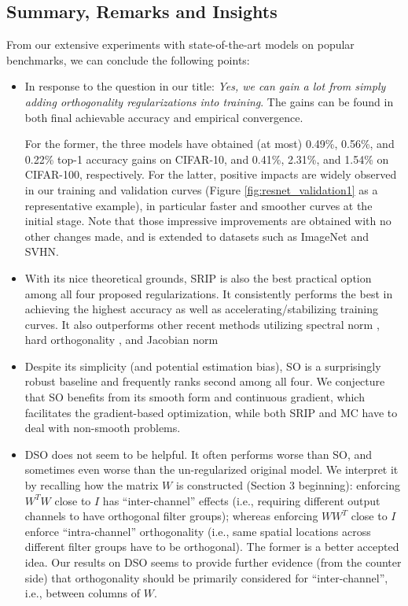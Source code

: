 \documentclass{article}
\begin{document}
\subsection{Summary, Remarks and Insights}
From our extensive experiments with state-of-the-art models on popular benchmarks, we can conclude the following points:
\begin{itemize}
\vspace{-0.6em}
    \item In response to the question in our title: \textit{Yes, we can gain a lot from simply adding orthogonality regularizations into training}. The gains can be found in both final achievable accuracy and empirical convergence.

    For the former, the three models have obtained (at most) 0.49\%, 0.56\%, and 0.22\% top-1 accuracy gains on CIFAR-10, and 0.41\%, 2.31\%, and 1.54\% on CIFAR-100, respectively. For the latter, positive impacts are widely observed in our training and validation curves (Figure \ref{fig:resnet_validation1} as a representative example), in particular faster and smoother curves at the initial stage.
    Note that those impressive improvements are obtained with no other changes made, and is extended to datasets such as  ImageNet and SVHN.

    \item With its nice theoretical grounds, SRIP is also the best practical option among all four proposed regularizations. It consistently performs the best in achieving the highest accuracy as well as accelerating/stabilizing training curves. It also outperforms other recent methods utilizing spectral norm \cite{yoshida2017spectral}, hard orthogonality \cite{huang2017orthogonal}, and Jacobian norm \cite{sokolic2017robust}

    \item Despite its simplicity (and potential estimation bias), SO is a surprisingly robust baseline and frequently ranks second among all four. We conjecture that SO benefits from its smooth form and continuous gradient, which facilitates the gradient-based optimization, while both SRIP and MC have to deal with non-smooth problems.

    \item DSO does not seem to be helpful. It often performs worse than SO, and sometimes even worse than the un-regularized original model. We interpret it by recalling how the matrix $W$ is constructed (Section 3 beginning): enforcing $W^TW$ close to $I$ has ``inter-channel'' effects (i.e., requiring different output channels to have orthogonal filter groups); whereas enforcing $WW^T$ close to $I$ enforce ``intra-channel'' orthogonality (i.e., same spatial locations across different filter groups have to be orthogonal). The former is a better accepted idea. Our results on DSO seems to provide further evidence (from the counter side) that orthogonality should be primarily considered for ``inter-channel'', i.e., between columns of $W$.


\end{itemize}
\end{document}
